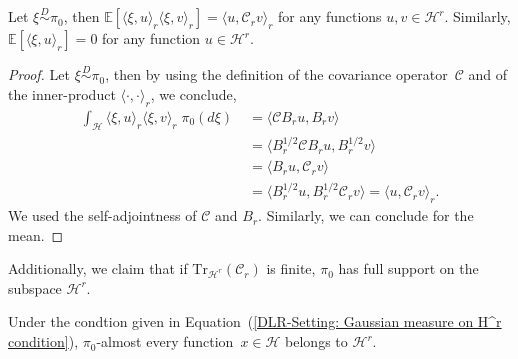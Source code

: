\begin{claim}
\label{DLR-Setting: Claim1 Gaussian measure}
 Let $\xi \stackrel{D}{\sim} \pi_0$, then $\mathbb{E} [\langle \xi, u \rangle_r \langle \xi , v \rangle_r ] = \langle u , \mathcal{C}_r v \rangle_r$ for any functions $u,v \in \mathcal{H}^r$. Similarly, $\mathbb{E} [\langle \xi, u \rangle_r  ] = 0$ for any function $u \in \mathcal{H}^r$.
\end{claim}

\begin{proof}
 Let $\xi \stackrel{D}{\sim} \pi_0$, then by using the definition of the covariance operator~$\mathcal{C}$ and of the inner-product $\langle \cdot, \cdot \rangle_r$, we conclude,
 \begin{align*}
  \int_{\mathcal{H}} \langle \xi, u \rangle_r \langle \xi , v \rangle_r \; \pi_0 (d\xi) & \; = \langle \mathcal{C} B_r u , B_r v \rangle \\
  & \; = \langle B_r^{1/2} \mathcal{C} B_r u , B_r^{1/2} v \rangle \\
  & \; = \langle  B_r u , \mathcal{C}_r v \rangle \\	
  & \; = \langle  B_r^{1/2} u , B_r^{1/2} \mathcal{C}_r v \rangle = \langle u, \mathcal{C}_r v \rangle_r.
 \end{align*}
 We used the self-adjointness of $\mathcal{C}$ and $B_r$. Similarly, we can conclude for the mean.

\end{proof}

Additionally, we claim that if $\text{Tr}_{\mathcal{H}^r}(\mathcal{C}_r)$ is finite, $\pi_0$ has full support on the subspace $\mathcal{H}^r$.

\begin{claim}
\label{DLR-Setting: Claim2 Full support}
 Under the condtion given in Equation~(\ref{DLR-Setting: Gaussian measure on H^r condition}), $\pi_0 $-almost every function~$x \in \mathcal{H}$ belongs to $\mathcal{H}^r$.
\end{claim}

